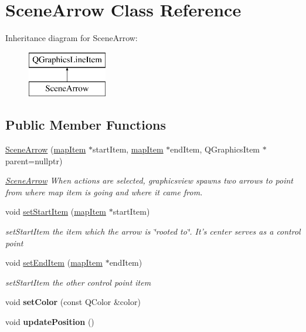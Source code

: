 \hypertarget{class_scene_arrow}{\section{Scene\-Arrow Class Reference}
\label{class_scene_arrow}
}
Inheritance diagram for Scene\-Arrow\-:\begin{figure}[H]
\begin{center}
\leavevmode
\includegraphics[height=2.000000cm]{class_scene_arrow}
\end{center}
\end{figure}
\subsection*{Public Member Functions}
\begin{DoxyCompactItemize}
\item 
\hyperlink{class_scene_arrow_a0ee21a9c77e7a437d1af6e3302cefb9b}{Scene\-Arrow} (\hyperlink{classmap_item}{map\-Item} $\ast$start\-Item, \hyperlink{classmap_item}{map\-Item} $\ast$end\-Item, Q\-Graphics\-Item $\ast$parent=nullptr)
\begin{DoxyCompactList}\small\item\em \hyperlink{class_scene_arrow}{Scene\-Arrow} When actions are selected, graphicsview spawns two arrows to point from where map item is going and where it came from. \end{DoxyCompactList}\item 
void \hyperlink{class_scene_arrow_a90f3abb2a74dacb199b8ac1dfb2bd857}{set\-Start\-Item} (\hyperlink{classmap_item}{map\-Item} $\ast$start\-Item)
\begin{DoxyCompactList}\small\item\em set\-Start\-Item the item which the arrow is \char`\"{}rooted to\char`\"{}. It's center serves as a control point \end{DoxyCompactList}\item 
void \hyperlink{class_scene_arrow_a407e126958287e870fd3fcaf28038624}{set\-End\-Item} (\hyperlink{classmap_item}{map\-Item} $\ast$end\-Item)
\begin{DoxyCompactList}\small\item\em set\-Start\-Item the other control point item \end{DoxyCompactList}\item 
\hypertarget{class_scene_arrow_ad53bf7d32377f1a7d26a74181555a923}{void {\bfseries set\-Color} (const Q\-Color \&color)}\label{class_scene_arrow_ad53bf7d32377f1a7d26a74181555a923}

\item 
\hypertarget{class_scene_arrow_a712c5c3407b8b1a7c87f212ba1924b61}{void {\bfseries update\-Position} ()}\label{class_scene_arrow_a712c5c3407b8b1a7c87f212ba1924b61}

\end{DoxyCompactItemize}
